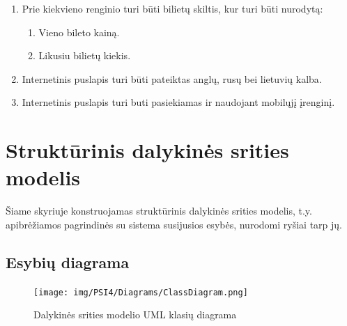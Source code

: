\documentclass{VUMIFPSkursinis}
\begin{document}
\begin{enumerate}[label=\textbf{FR\arabic*}]
			    \item Prie kiekvieno renginio turi būti bilietų skiltis, kur turi būti nurodytą:
					\begin{enumerate}[label*=\textbf{.\arabic*}]
						\item Vieno bileto kainą.
						\item Likusiu bilietų kiekis.
					\end{enumerate}
				\item Internetinis puslapis turi būti pateiktas anglų, rusų bei lietuvių kalba.
				\item  Internetinis puslapis turi buti pasiekiamas ir naudojant mobilųjį įrenginį.
			\end{enumerate}

    \section{Struktūrinis dalykinės srities modelis} \label{strukturinisDSModelis}
		Šiame skyriuje konstruojamas struktūrinis dalykinės srities modelis, t.y. apibrėžiamos pagrindinės su sistema susijusios esybės, nurodomi ryšiai tarp jų.
        \subsection{Esybių diagrama} \label{strukturinisDSModelis_esybiuDiagrama}
            \begin{figure}[H]
                \centering
                \texttt{[image: img/PSI4/Diagrams/ClassDiagram.png]}
                \caption{Dalykinės srities modelio UML klasių diagrama}
                \label{fig:DS-klasiu-diagrama}
            \end{figure}
\end{document}
